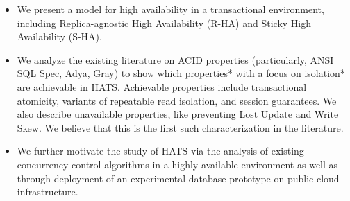 \begin{itemize}
\item We present a model for high availability in a transactional environment, including Replica-agnostic High Availability (R-HA) and Sticky High Availability (S-HA).
\item We analyze the existing literature on ACID properties (particularly, ANSI SQL Spec, Adya, Gray) to show which properties* with a focus on isolation* are achievable in HATS. Achievable properties include transactional atomicity, variants of repeatable read isolation, and session guarantees. We also describe unavailable properties, like preventing Lost Update and Write Skew. We believe that this is the first such characterization in the literature.
\item We further motivate the study of HATS via the analysis of existing concurrency control algorithms in a highly available environment as well as through deployment of an experimental database prototype on public cloud infrastructure.
\end{itemize}

